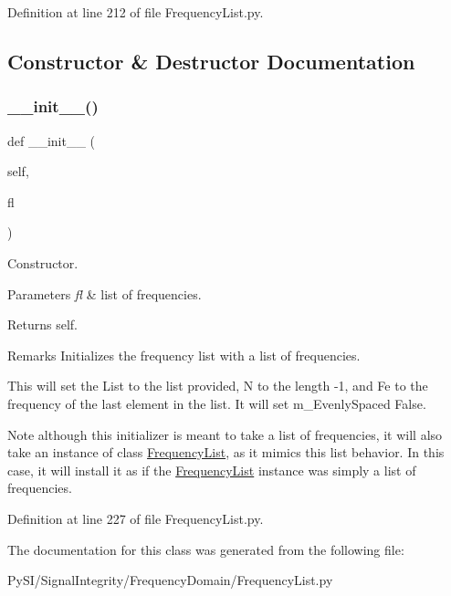 Definition at line 212 of file Frequency\+List.\+py.



\subsection{Constructor \& Destructor Documentation}
\mbox{\label{classSignalIntegrity_1_1FrequencyDomain_1_1FrequencyList_1_1GenericFrequencyList_a9a74e46546d1e8002152b5d0e79786c4}} 
\subsubsection{\texorpdfstring{\+\_\+\+\_\+init\+\_\+\+\_\+()}{\_\_init\_\_()}}
{\footnotesize\ttfamily def \+\_\+\+\_\+init\+\_\+\+\_\+ (\begin{DoxyParamCaption}\item[{}]{self,  }\item[{}]{fl }\end{DoxyParamCaption})}



Constructor. 


\begin{DoxyParams}{Parameters}
{\em fl} & list of frequencies. \\
\hline
\end{DoxyParams}
\begin{DoxyReturn}{Returns}
self. 
\end{DoxyReturn}
\begin{DoxyRemark}{Remarks}
Initializes the frequency list with a list of frequencies.
\end{DoxyRemark}
This will set the List to the list provided, N to the length -\/1, and Fe to the frequency of the last element in the list. It will set m\+\_\+\+Evenly\+Spaced False.

\begin{DoxyNote}{Note}
although this initializer is meant to take a list of frequencies, it will also take an instance of class \hyperlink{classSignalIntegrity_1_1FrequencyDomain_1_1FrequencyList_1_1FrequencyList}{Frequency\+List}, as it mimics this list behavior. In this case, it will install it as if the \hyperlink{classSignalIntegrity_1_1FrequencyDomain_1_1FrequencyList_1_1FrequencyList}{Frequency\+List} instance was simply a list of frequencies. 
\end{DoxyNote}


Definition at line 227 of file Frequency\+List.\+py.



The documentation for this class was generated from the following file\+:\begin{DoxyCompactItemize}
\item 
Py\+S\+I/\+Signal\+Integrity/\+Frequency\+Domain/Frequency\+List.\+py\end{DoxyCompactItemize}

